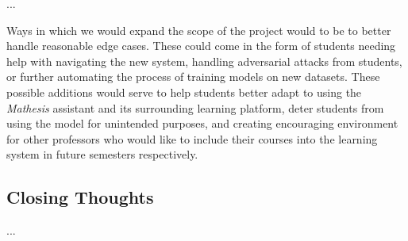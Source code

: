 \documentclass[12pt,a4paper]{article}
\begin{document}
    ...

    Ways in which we would expand the scope of the project would to be to better handle reasonable
    edge cases.  These could come in the form of students needing help with navigating the new system,
    handling adversarial attacks from students, or further automating the process of training models
    on new datasets.  These possible additions would serve to help students better adapt to using the
    \textit{Mathesis} assistant and its surrounding learning platform, deter students from using
    the model for unintended purposes, and creating encouraging environment for other professors who
    would like to include their courses into the learning system in future semesters respectively.

    \subsection{Closing Thoughts}
    ...

    \pagebreak
    
    
    
\end{document}

